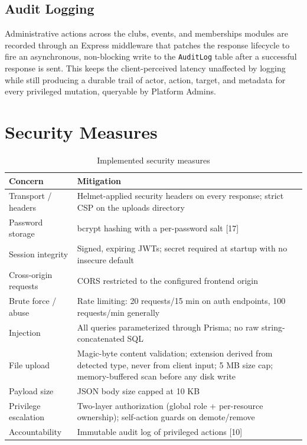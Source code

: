 \documentclass[12pt,oneside]{book}
\begin{document}
\subsection{Audit Logging}
Administrative actions across the clubs, events, and memberships modules are recorded through an Express middleware that patches the response lifecycle to fire an asynchronous, non-blocking write to the \texttt{AuditLog} table after a successful response is sent. This keeps the client-perceived latency unaffected by logging while still producing a durable trail of actor, action, target, and metadata for every privileged mutation, queryable by Platform Admins.

\section{Security Measures}

\begin{table}[H]
\caption{Implemented security measures}
\label{tab:4.6}
\centering
\small
\begin{tabularx}{\textwidth}{@{}p{3.4cm}X@{}}
\toprule
Concern & Mitigation \\
\midrule
Transport / headers & Helmet-applied security headers on every response; strict CSP on the uploads directory \\
Password storage & bcrypt hashing with a per-password salt [17] \\
Session integrity & Signed, expiring JWTs; secret required at startup with no insecure default \\
Cross-origin requests & CORS restricted to the configured frontend origin \\
Brute force / abuse & Rate limiting: 20 requests/15 min on auth endpoints, 100 requests/min generally \\
Injection & All queries parameterized through Prisma; no raw string-concatenated SQL \\
File upload & Magic-byte content validation; extension derived from detected type, never from client input; 5 MB size cap; memory-buffered scan before any disk write \\
Payload size & JSON body size capped at 10 KB \\
Privilege escalation & Two-layer authorization (global role + per-resource ownership); self-action guards on demote/remove \\
Accountability & Immutable audit log of privileged actions [10] \\
\bottomrule
\end{tabularx}
\end{table}
\end{document}
